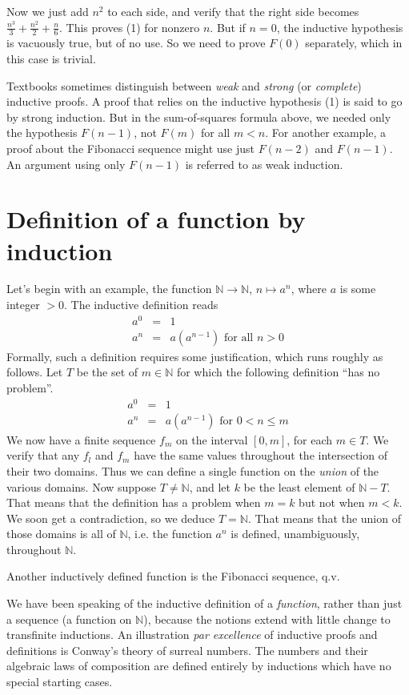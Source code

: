\documentclass{article}
\begin{document}
Now we just add $n^2$ to each side, and verify that the right side becomes
$\frac{n^3}{3} + \frac{n^2}{2} + \frac{n}{6}$.
This proves (1) for nonzero $n$.
But if $n=0$, the inductive hypothesis is vacuously true, but of no use.
So we need to prove $F(0)$ separately, which in this case is trivial.

Textbooks sometimes distinguish between \emph{weak} and
\emph{strong} (or \emph{complete}) inductive proofs.
A proof that relies on the inductive hypothesis (1) is said to go
by strong induction. But in the sum-of-squares formula above,
we needed only the hypothesis $F(n-1)$, not $F(m)$ for all $m<n$.
For another example, a proof about the Fibonacci sequence might
use just $F(n-2)$ and $F(n-1)$.
An argument using only $F(n-1)$ is referred to as weak induction.

\section{Definition of a function by induction}
Let's begin with an example, the function $\mathbb{N}\to\mathbb{N}$,
$n\mapsto a^n$, where $a$ is some integer $>0$.
The inductive definition reads
\begin{eqnarray*}
a^0 & = & 1 \\
a^n & = & a(a^{n-1}) \textrm{ for all }n>0
\end{eqnarray*}
Formally, such a definition requires some justification, which runs roughly
as follows.
Let $T$ be the set of $m\in \mathbb{N}$ for which the following
definition ``has no problem''.
\begin{eqnarray*}
a^0 & = & 1 \\
a^n & = & a(a^{n-1}) \textrm{ for }0<n\le m
\end{eqnarray*}
We now have a finite sequence $f_m$ on the interval $[0,m]$, for
each $m\in T$.
We verify that any $f_l$ and $f_m$ have the same values
throughout the intersection of their two domains.
Thus we can define a single function on the \emph{union} of the
various domains.
Now suppose $T\ne\mathbb{N}$, and let $k$ be the least element of
$\mathbb{N}-T$.
That means that the definition has a problem when $m=k$
but not when $m<k$.
We soon get a contradiction, so we deduce $T=\mathbb{N}$.
That means that the union of those domains is all of $\mathbb{N}$, i.e.
the function $a^n$ is defined, unambiguously, throughout $\mathbb{N}$.

Another inductively defined function is the Fibonacci sequence, q.v.

We have been speaking of the inductive definition of a \emph{function},
rather than just a sequence (a function on $\mathbb{N}$), because the
notions extend with little change to transfinite inductions.
An illustration \emph{par excellence} of inductive proofs and
definitions is Conway's theory of surreal numbers.
The numbers and their algebraic laws of composition are defined
entirely by inductions which have no special starting cases.
\end{document}
